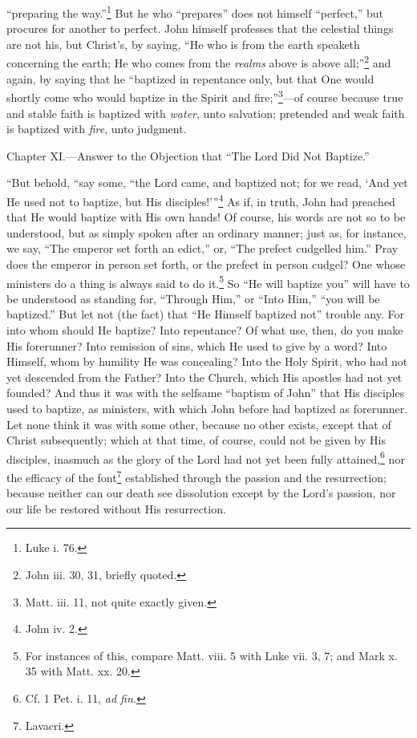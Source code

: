 “preparing the way.”\footnote{Luke i. 76.} But he who “prepares” does not himself “perfect,” but procures for another to perfect. John himself professes that the celestial things are not his, but Christ’s, by saying, “He who is from the earth speaketh concerning the earth; He who comes from the \emph{realms} above is above all;”\footnote{John iii. 30, 31, briefly quoted.} and again, by saying that he “baptized in repentance only, but that One would shortly come who would baptize in the Spirit and fire;”\footnote{Matt. iii. 11, not quite exactly given.}—of course because true and stable faith is baptized with \emph{water}, unto salvation; pretended and weak faith is baptized with \emph{fire}, unto judgment.


Chapter XI.—Answer to the Objection that “The Lord Did Not Baptize.”

“But behold, “say some, “the Lord came, and baptized not; for we read, ‘And yet He used not to baptize, but His disciples!’”\footnote{John iv. 2.} As if, in truth, John had preached that He would baptize with His own hands! Of course, his words are not so to be understood, but as simply spoken after an ordinary manner; just as, for instance, we say, “The emperor set forth an edict,” or, “The prefect cudgelled him.” Pray does the emperor in person set forth, or the prefect in person cudgel? One whose ministers do a thing is always said to do it.\footnote{For instances of this, compare Matt. viii. 5 with Luke vii. 3, 7; and Mark x. 35 with Matt. xx. 20.} So “He will baptize you” will have to be understood as standing for, “Through Him,” or “Into Him,” “you will be baptized.” But let not (the fact) that “He Himself baptized not” trouble any. For into whom should He baptize? Into repentance? Of what use, then, do you make His forerunner? Into remission of sins, which He used to give by a word? Into Himself, whom by humility He was concealing? Into the Holy Spirit, who had not yet descended from the Father? Into the Church, which His apostles had not yet founded? And thus it was with the selfsame “baptism of John” that His disciples used to baptize, as ministers, with which John before had baptized as forerunner. Let none think it was with some other, because no other exists, except that of Christ subsequently; which at that time, of course, could not be given by His disciples, inasmuch as the glory of the Lord had not yet been fully attained,\footnote{Cf. 1 Pet. i. 11, \emph{ad fin.}} nor the efficacy of the font\footnote{Lavacri.} established through the passion and the resurrection; because neither can our death see dissolution except by the Lord’s passion, nor our life be restored without His resurrection.

